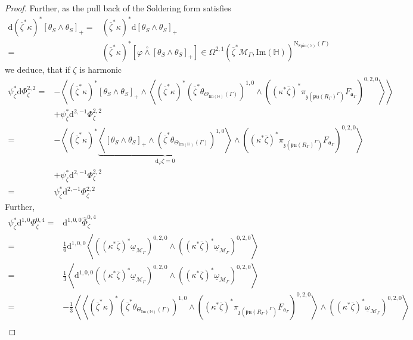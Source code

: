 \documentclass[psamsfonts]{amsart}
\theoremstyle{plain}
\theoremstyle{definition}{
\newtheorem{defi}{Definition}[section]
\newtheorem{ass}{Assumption}
\newtheorem*{nota}{Notation}}
\theoremstyle{remark}{
\newtheorem{rem}{Remark}
\newtheorem{ex}{Example}}
\theoremstyle{plain}{
\newtheorem{thm}{Theorem}[section]
\newtheorem{lem}{Lemma}[section]
\newtheorem{cor}{Corollary}[section]
\newtheorem{prop}{Proposition}[section]
\newtheorem{con}{Conjecture}[section]}
\newcommand{\m}[1]{{\mathrm{#1}}}
\begin{document}
\begin{proof}
Further, as the pull back of the Soldering form satisfies
\begin{align*}
    \m{d}(\overline{\zeta}^*\kappa)^*\left[\theta_{S}\wedge\theta_S\right]_+=&(\overline{\zeta}^*\kappa)^*\m{d}\left[\theta_{S}\wedge\theta_S\right]_+\\
    =&(\overline{\zeta}^*\kappa)^*[\varphi\overset{\circ}{\wedge}\left[\theta_{S}\wedge\theta_S\right]_+]\in\Omega^{2,1}(\overline{\zeta}^*\mathcal{M}_\Gamma,\m{Im}(\mathbb{H}))^{\m{N}_{\m{Spin}(7)}(\Gamma)}
\end{align*}
we deduce, that if $\zeta$ is harmonic
\begin{align*}
    \psi_\zeta^*\m{d}\Phi^{2,2}_\zeta=&-\left<(\overline{\zeta}^*\kappa)^*\left[\theta_{S}\wedge\theta_S\right]_+\wedge\left<(\overline{\zeta}^*\kappa)^*(\overline{\zeta}^*\theta_{\Theta_{\m{Im}(\mathbb{H})}(\Gamma)})^{1,0}\wedge((\kappa^*\overline{\zeta})^*\pi_{\mathfrak{z}(\mathfrak{pu}(R_\Gamma)^{\Gamma})}F_{\mathfrak{a}_\Gamma})^{0,2,0}\right>\right>\\
    &+\psi^*_\zeta\m{d}^{2,-1}\Phi^{2,2}_\zeta\\
    =&-\left<(\overline{\zeta}^*\kappa)^*\underbrace{\left<\left[\theta_{S}\wedge\theta_S\right]_+\wedge(\overline{\zeta}^*\theta_{\Theta_{\m{Im}(\mathbb{H})}(\Gamma)})^{1,0}\right>}_{\m{d}_{\varphi}\zeta=0}\wedge((\kappa^*\overline{\zeta})^*\pi_{\mathfrak{z}(\mathfrak{pu}(R_\Gamma)^{\Gamma})}F_{\mathfrak{a}_\Gamma})^{0,2,0}\right>\\
    &+\psi^*_\zeta\m{d}^{2,-1}\Phi^{2,2}_\zeta\\
    =&\psi^*_\zeta\m{d}^{2,-1}\Phi^{2,2}_\zeta
\end{align*}
Further,
\begin{align*}
    \psi_\zeta^*\m{d}^{1,0}\Phi_\zeta^{0,4}=&\m{d}^{1,0,0}\hat{\Phi}_\zeta^{0,4}\\
    =&\frac{1}{6}\m{d}^{1,0,0}\left<((\kappa^*\overline{\zeta})^*\underline{\omega}_{\mathcal{M}_\Gamma})^{0,2,0}\wedge((\kappa^*\overline{\zeta})^*\underline{\omega}_{\mathcal{M}_\Gamma})^{0,2,0}\right>\\
    =&\frac{1}{3}\left<\m{d}^{1,0,0}((\kappa^*\overline{\zeta})^*\underline{\omega}_{\mathcal{M}_\Gamma})^{0,2,0}\wedge((\kappa^*\overline{\zeta})^*\underline{\omega}_{\mathcal{M}_\Gamma})^{0,2,0}\right>\\
    =&-\frac{1}{3}\left<\left<(\overline{\zeta}^*\kappa)^*(\overline{\zeta}^*\theta_{\Theta_{\m{Im}(\mathbb{H})}(\Gamma)})^{1,0}\wedge((\kappa^*\overline{\zeta})^*\pi_{\mathfrak{z}(\mathfrak{pu}(R_\Gamma)^{\Gamma})}F_{\mathfrak{a}_\Gamma})^{0,2,0}\right>\wedge((\kappa^*\overline{\zeta})^*\underline{\omega}_{\mathcal{M}_\Gamma})^{0,2,0}\right>\\

\end{align*}
\end{proof}
\end{document}
